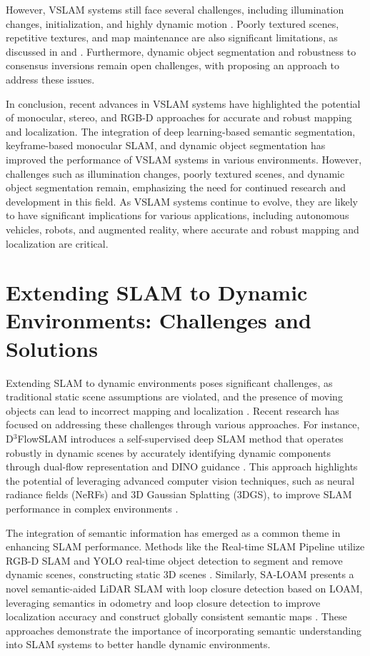 \documentclass[conference]{IEEEtran}
\begin{document}
However, VSLAM systems still face several challenges, including illumination changes, initialization, and highly dynamic motion \cite{b4}. Poorly textured scenes, repetitive textures, and map maintenance are also significant limitations, as discussed in \cite{b1} and \cite{b4}. Furthermore, dynamic object segmentation and robustness to consensus inversions remain open challenges, with \cite{b5} proposing an approach to address these issues.

In conclusion, recent advances in VSLAM systems have highlighted the potential of monocular, stereo, and RGB-D approaches for accurate and robust mapping and localization. The integration of deep learning-based semantic segmentation, keyframe-based monocular SLAM, and dynamic object segmentation has improved the performance of VSLAM systems in various environments. However, challenges such as illumination changes, poorly textured scenes, and dynamic object segmentation remain, emphasizing the need for continued research and development in this field. As VSLAM systems continue to evolve, they are likely to have significant implications for various applications, including autonomous vehicles, robots, and augmented reality, where accurate and robust mapping and localization are critical.

\section{Extending SLAM to Dynamic Environments: Challenges and Solutions}
Extending SLAM to dynamic environments poses significant challenges, as traditional static scene assumptions are violated, and the presence of moving objects can lead to incorrect mapping and localization \cite{b1}. Recent research has focused on addressing these challenges through various approaches. For instance, D$^3$FlowSLAM introduces a self-supervised deep SLAM method that operates robustly in dynamic scenes by accurately identifying dynamic components through dual-flow representation and DINO guidance \cite{b2}. This approach highlights the potential of leveraging advanced computer vision techniques, such as neural radiance fields (NeRFs) and 3D Gaussian Splatting (3DGS), to improve SLAM performance in complex environments \cite{b3}.

The integration of semantic information has emerged as a common theme in enhancing SLAM performance. Methods like the Real-time SLAM Pipeline utilize RGB-D SLAM and YOLO real-time object detection to segment and remove dynamic scenes, constructing static 3D scenes \cite{b4}. Similarly, SA-LOAM presents a novel semantic-aided LiDAR SLAM with loop closure detection based on LOAM, leveraging semantics in odometry and loop closure detection to improve localization accuracy and construct globally consistent semantic maps \cite{b5}. These approaches demonstrate the importance of incorporating semantic understanding into SLAM systems to better handle dynamic environments.
\end{document}
